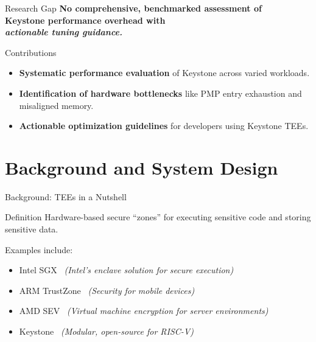 \documentclass[aspectratio=169]{beamer}
\begin{document}
\begin{frame}{Research Gap}
\centering
\Large\bfseries
No comprehensive, benchmarked assessment of \\
\textbf{Keystone} performance overhead with \\
\textit{actionable tuning guidance.}
\end{frame}

\begin{frame}{Contributions}
\begin{itemize}
    \item \textbf{Systematic performance evaluation} of Keystone across varied workloads.
    \item \textbf{Identification of hardware bottlenecks} like PMP entry exhaustion and misaligned memory.
    \item \textbf{Actionable optimization guidelines} for developers using Keystone TEEs.
\end{itemize}
\end{frame}

\section{Background and System Design}

\begin{frame}{Background: TEEs in a Nutshell}
\begin{block}{Definition}
Hardware-based secure “zones” for executing sensitive code and storing sensitive data.
\end{block}
Examples include:
\begin{itemize}
    \item Intel SGX \faMicrochip\ \textit{(Intel's enclave solution for secure execution)} 
    \item ARM TrustZone \faLock\ \textit{(Security for mobile devices)}
    \item AMD SEV \faServer\ \textit{(Virtual machine encryption for server environments)}
    \item Keystone \faKey\ \textit{(Modular, open-source for RISC-V)}
\end{itemize}
\end{frame}

\end{document}
